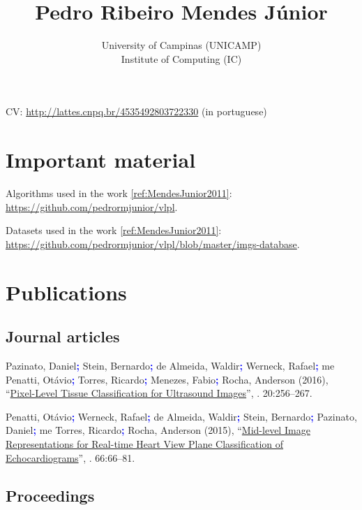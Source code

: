 \documentclass{article}
\title{Pedro Ribeiro Mendes J{\'u}nior}
\author{University of Campinas (UNICAMP)\\Institute of Computing (IC)}
\date{}
\newcommand{\myurl}[1]{\href{#1}{#1}}
\newcommand{\ifnotempty}[2]{\ifthenelse{\equal{#1}{}}{}{#2}}
\newcommand{\journal}[9]{\label{#1} #2 (#3), ``\href{#4}{#5}'', \emph{\glsfirst{#6}}. #7\ifnotempty{#8}{(#8)}:#9.}
\newcommand{\sepauthor}{\textcolor{blue}{\bf;}}
\newcommand{\authorname}[3][\sepauthor{}]{#3, #2#1}
\begin{document}
\maketitle

CV: \myurl{http://lattes.cnpq.br/4535492803722330} (in portuguese)

\section*{Important material}
\label{sec:important-material}

Algorithms used in the work \ref{ref:MendesJunior2011}: \myurl{https://github.com/pedrormjunior/vlpl}.

Datasets used in the work \ref{ref:MendesJunior2011}: \myurl{https://github.com/pedrormjunior/vlpl/blob/master/imgs-database}.

\section*{Publications}

\subsection*{Journal articles}

\begin{enumerate}[label={[\arabic*]}]
\item\journal{ref:Pazinato2016}
  {
    \authorname{Daniel}{Pazinato}
    \authorname{Bernardo}{Stein}
    \authorname{Waldir}{de Almeida}
    \authorname{Rafael}{Werneck}
    \gls{me}
    \authorname{Otávio}{Penatti}
    \authorname{Ricardo}{Torres}
    \authorname{Fabio}{Menezes}
    \authorname[]{Anderson}{Rocha}
  }
  {2016}
  {http://dx.doi.org/10.1109/JBHI.2014.2386796}
  {Pixel-Level Tissue Classification for Ultrasound Images}
  {jbhi}
  {20}
  {1}
  {256--267}
\item\journal{ref:Penatti2015}
  {
    \authorname{Otávio}{Penatti}
    \authorname{Rafael}{Werneck}
    \authorname{Waldir}{de Almeida}
    \authorname{Bernardo}{Stein}
    \authorname{Daniel}{Pazinato}
    \gls{me}
    \authorname{Ricardo}{Torres}
    \authorname[]{Anderson}{Rocha}
  }
  {2015}
  {http://dx.doi.org/10.1016/j.compbiomed.2015.08.004}
  {Mid-level Image Representations for Real-time Heart View Plane Classification of Echocardiograms}
  {compbiomed}
  {66}
  {}
  {66--81}
\end{enumerate}

\subsection*{Proceedings}
\end{document}
